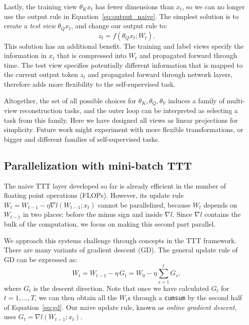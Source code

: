 \documentclass{article}
\begin{document}
Lastly, the training view $\theta_Kx_t$ has fewer dimensions than $x_t$, so we can no longer use the output rule in Equation~\ref{eq:output_naive}.
The simplest solution is to create a \emph{test view} $\theta_Qx_t$, and change our output rule to:
\begin{equation}
\label{eq:output}
z_t = f\left(\theta_Qx_t; W_t\right).
\end{equation}
This solution has an additional benefit. 
The training and label views specify the information in $x_t$ that is compressed into $W_t$ and propagated forward through time.
The test view specifies potentially different information that is mapped to the current output token $z_t$ and propagated forward through network layers, therefore adds more flexibility to the self-supervised task.

Altogether, the set of all possible choices for $\theta_K,\theta_Q,\theta_V$ induces a family of multi-view reconstruction tasks, and the outer loop can be interpreted as selecting a task from this family.
Here we have designed all views as linear projections for simplicity. 
Future work might experiment with more flexible transformations, or bigger and different families of self-supervised tasks.

\subsection{Parallelization with mini-batch TTT}
\label{subsec:mini-batch}

The naive TTT layer developed so far is already efficient in the number of floating point operations (FLOPs).
However, its update rule $W_t = W_{t-1} - \eta\nabla l(W_{t-1}; x_t)$ cannot be parallelized, 
because $W_t$ depends on $W_{t-1}$ in two places: before the minus sign and inside $\nabla l$.
Since $\nabla l$ contains the bulk of the computation, we focus on making this second part parallel.

We approach this systems challenge through concepts in the TTT framework. There are many variants of gradient descent (GD). 
The general update rule of GD can be expressed as:
\begin{equation}
\label{eq:gd}
W_t = W_{t-1} - \eta\,G_t = W_0 - \eta\sum_{s=1}^t G_s,
\end{equation}
where $G_t$ is the descent direction.
Note that once we have calculated $G_t$ for $t=1,\dots,T$, we can then obtain all the $W_t$s through a \texttt{cumsum} by the second half of Equation~\ref{eq:gd}.
Our naive update rule, known as \emph{online gradient descent}, 
uses \mbox{$G_t = \nabla l(W_{t-1}; x_t)$}.
\end{document}
